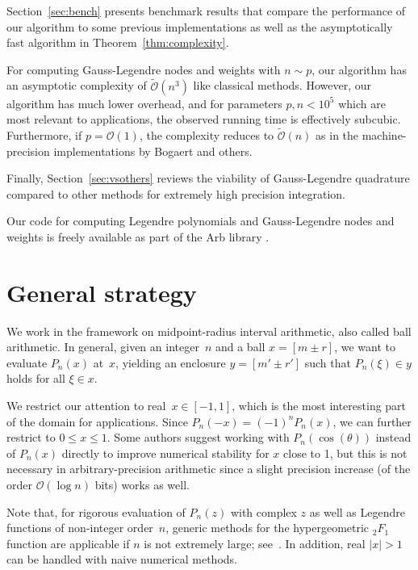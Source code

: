 \documentclass{siamart0216}
\newcommand{\OO}{\mathcal{O}}
\newcommand{\OOtilde}{\widetilde{\mathcal{O}}}
\begin{document}
Section~\ref{sec:bench} presents benchmark results
that compare the performance
of our algorithm
to some previous implementations
as well as the asymptotically fast algorithm in Theorem~\ref{thm:complexity}.

For computing Gauss-Legendre nodes and weights with $n \sim p$,
our algorithm has an asymptotic complexity of $\OOtilde(n^3)$ like
classical methods. However, our algorithm has much lower overhead,
and for parameters $p, n < 10^5$ which are most relevant to applications,
the observed running time is effectively subcubic.
Furthermore, if $p = \OO(1)$, the complexity reduces to $\OOtilde(n)$
as in the machine-precision implementations by Bogaert and others.

Finally, Section~\ref{sec:vsothers} reviews the viability of Gauss-Legendre
quadrature compared to other methods
for extremely high precision integration.

Our code for computing Legendre polynomials and
Gauss-Legendre nodes and weights is freely available as part of
the Arb library \cite{Johansson2017arb}.

\section{General strategy}

\label{sec:general}

We work in the framework on midpoint-radius interval arithmetic,
also called ball arithmetic.
In general, given an integer~$n$ and a ball $x = [m \pm r]$,
we want to evaluate $P_n(x)$ at~$x$,
yielding an enclosure $y = [m' \pm r']$ such that $P_n(\xi) \in y$
holds for all $\xi \in x$.

We restrict our attention to real~$x \in [-1, 1]$,
which is the most interesting part of the domain for applications.
Since $P_n(-x) = (-1)^n P_n(x)$, we can further
restrict to $0 \le x \le 1$.
Some authors suggest working with $P_n(\cos(\theta))$ instead of $P_n(x)$
directly to improve numerical stability for $x$ close to 1, but
this is not necessary in arbitrary-precision arithmetic since
a slight precision increase (of the order $\OO(\log n)$ bits)
works as well.

Note that, for rigorous evaluation of $P_n(z)$ with complex $z$
as well as Legendre functions of non-integer order $n$,
generic methods for the hypergeometric ${}_2F_1$ function
are applicable if $n$ is not extremely large; see~\cite{johansson2016hypergeometric}.
In addition, real $|x| > 1$ can be handled with naive numerical methods.
\end{document}
